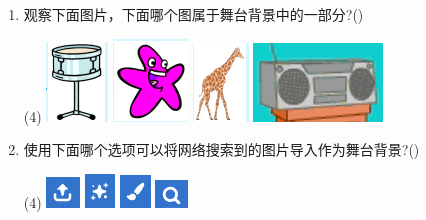 \documentclass[10pt, a4paper]{article}
\begin{document}
\begin{enumerate}
       \item 观察下面图片，下面哪个图属于舞台背景中的一部分?(\qquad)
       \begin{tasks}(4)
           \task \includegraphics[width=.05\textwidth]{10a.png}
           \task \includegraphics[width=.05\textwidth]{10b.png}
           \task \includegraphics[width=.05\textwidth]{10c.png}
           \task \includegraphics[width=.08\textwidth]{10d.png}
       \end{tasks}

        \item 使用下面哪个选项可以将网络搜索到的图片导入作为舞台背景?(\qquad)
        \begin{tasks}(4)
            \task \includegraphics[width=.03\textwidth]{11a.png}
            \task \includegraphics[width=.03\textwidth]{11b.png}
            \task \includegraphics[width=.03\textwidth]{11c.png}
            \task \includegraphics[width=.03\textwidth]{11d.png}
        \end{tasks}


\end{enumerate}
\end{document}
